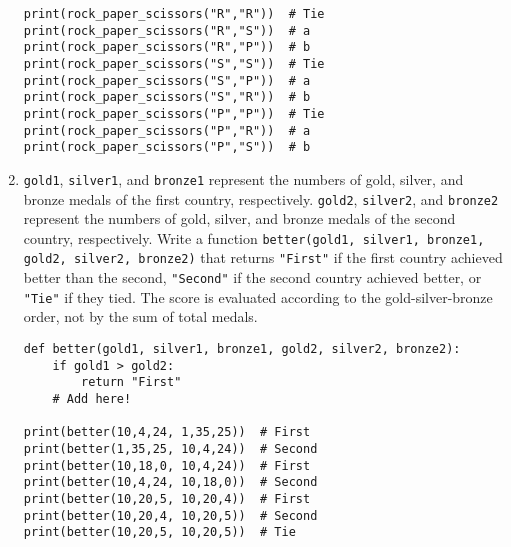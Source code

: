 \documentclass[../main.tex]{subfiles}
\begin{document}
\begin{enumerate}
\begin{verbatim}
print(rock_paper_scissors("R","R"))  # Tie
print(rock_paper_scissors("R","S"))  # a
print(rock_paper_scissors("R","P"))  # b
print(rock_paper_scissors("S","S"))  # Tie
print(rock_paper_scissors("S","P"))  # a
print(rock_paper_scissors("S","R"))  # b
print(rock_paper_scissors("P","P"))  # Tie
print(rock_paper_scissors("P","R"))  # a
print(rock_paper_scissors("P","S"))  # b
\end{verbatim}

\item \texttt{gold1}, \texttt{silver1}, and \texttt{bronze1} represent the
  numbers of gold, silver, and bronze medals of the first country,
  respectively.  \texttt{gold2}, \texttt{silver2}, and \texttt{bronze2}
  represent the numbers of gold, silver, and bronze medals of the second
  country, respectively.  Write a function \texttt{better(gold1, silver1,
  bronze1, gold2, silver2, bronze2)} that returns \texttt{"First"} if the first
  country achieved better than the second, \texttt{"Second"} if the second
  country achieved better, or \texttt{"Tie"} if they tied.  The score is
  evaluated according to the gold-silver-bronze order, not by the sum of total
  medals.
\begin{verbatim}
def better(gold1, silver1, bronze1, gold2, silver2, bronze2):
    if gold1 > gold2:
        return "First"
    # Add here!

print(better(10,4,24, 1,35,25))  # First
print(better(1,35,25, 10,4,24))  # Second
print(better(10,18,0, 10,4,24))  # First
print(better(10,4,24, 10,18,0))  # Second
print(better(10,20,5, 10,20,4))  # First
print(better(10,20,4, 10,20,5))  # Second
print(better(10,20,5, 10,20,5))  # Tie
\end{verbatim}

\end{enumerate}
\end{document}
